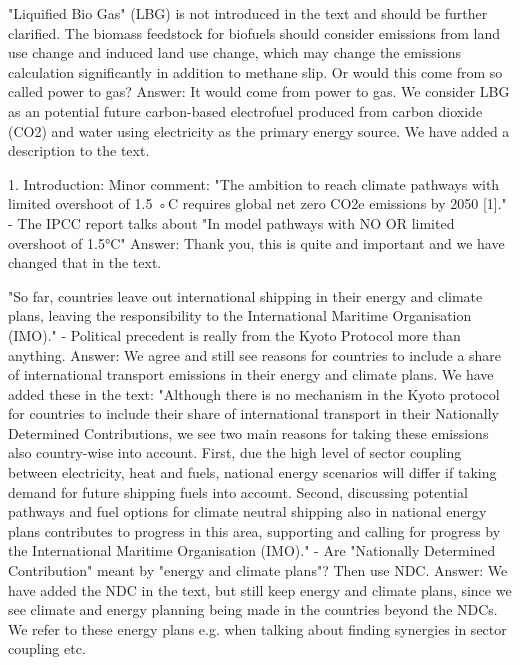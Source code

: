 "Liquified Bio Gas" (LBG) is not introduced in the text and should be further clarified. The biomass feedstock for biofuels should consider emissions from land use change and induced land use change, which may change the emissions calculation significantly in addition to methane slip. Or would this come from so called power to gas?
Answer: It would come from power to gas. We consider LBG as an potential future carbon-based electrofuel produced from carbon dioxide (CO2) and water using electricity as the primary energy source. We have added a description to the text.

1.	Introduction: 
Minor comment: "The ambition to reach climate pathways with limited overshoot of 1.5 ◦C requires global net zero CO2e emissions by 2050 [1]." 
-	The IPCC report talks about "In model pathways with NO OR limited overshoot of 1.5°C"
Answer: Thank you, this is quite and important and we have changed that in the text.

"So far, countries leave out international shipping in their energy and climate plans, leaving the responsibility to the International Maritime Organisation (IMO)."  
- Political precedent is really from the Kyoto Protocol more than anything.
Answer: We agree and still see reasons for countries to include a share of international transport emissions in their energy and climate plans. We have added these in the text: "Although there is no mechanism in the Kyoto protocol for countries to include their share of international transport in their Nationally Determined Contributions, we see two main reasons for taking these emissions also country-wise into account. First, due the high level of sector coupling between electricity, heat and fuels, national energy scenarios will differ if taking demand for future shipping fuels into account. Second, discussing potential pathways and fuel options for climate neutral shipping also in national energy plans contributes to progress in this area, supporting and calling for progress by the International Maritime Organisation (IMO)."
- Are "Nationally Determined Contribution" meant by "energy and climate plans"? Then use NDC.
Answer: We have added the NDC in the text, but still keep energy and climate plans, since we see climate and energy planning being made in the countries beyond the NDCs. We refer to these energy plans e.g. when talking about finding synergies in sector coupling etc.

